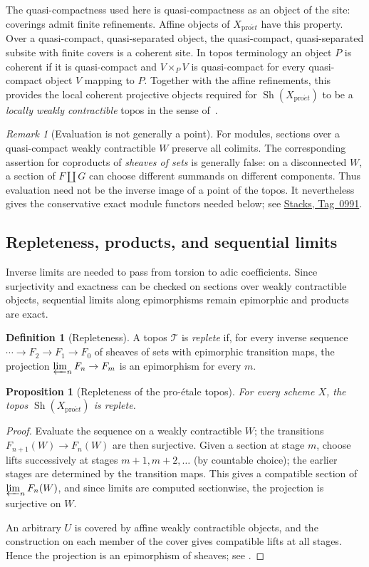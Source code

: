 \documentclass[11pt,a4paper]{article}
\numberwithin{equation}{section}
\newtheorem{proposition}[theorem]{Proposition}
\theoremstyle{definition}
\newtheorem{definition}[theorem]{Definition}
\theoremstyle{remark}
\newtheorem{remark}[theorem]{Remark}
\newcommand{\Sh}{\operatorname{Sh}}
\newcommand{\proet}{\mathrm{pro}\acute{e}t}
\newcommand{\stacks}[1]{\href{https://stacks.math.columbia.edu/tag/#1}{\textnormal{Stacks, Tag~#1}}}
\begin{document}
The quasi-compactness used here is quasi-compactness as an object of the
site: coverings admit finite refinements. Affine objects of
$X_{\proet}$ have this property. Over a quasi-compact, quasi-separated
object, the quasi-compact, quasi-separated subsite with finite covers is
a coherent site. In topos terminology an object $P$ is coherent if it
is quasi-compact and $V\times_PV$ is quasi-compact for every
quasi-compact object $V$ mapping to $P$. Together with the affine
refinements, this provides the local coherent projective objects
required for $\Sh(X_{\proet})$ to be a \emph{locally weakly
contractible} topos in the sense of~\cite{ProetaleBlueprint}.

\begin{remark}[Evaluation is not generally a point]
\label{pe:evaluation-not-point}
For modules, sections over a quasi-compact weakly contractible $W$
preserve all colimits. The corresponding assertion for coproducts of
\emph{sheaves of sets} is generally false: on a disconnected $W$, a
section of $F\amalg G$ can choose different summands on different
components. Thus evaluation need not be the inverse image of a point
of the topos. It nevertheless gives the conservative exact module
functors needed below; see \stacks{0991}.
\end{remark}

\subsection{Repleteness, products, and sequential limits}

Inverse limits are needed to pass from torsion to adic coefficients.
Since surjectivity and exactness can be checked on sections over weakly
contractible objects, sequential limits along epimorphisms remain
epimorphic and products are exact.

\begin{definition}[Repleteness]\label{pe:replete-def}
A topos $\mathcal T$ is \emph{replete} if, for every inverse sequence
$\cdots\to F_2\to F_1\to F_0$ of sheaves of sets with epimorphic
transition maps, the projection $\varprojlim_nF_n\to F_m$ is an
epimorphism for every $m$.
\end{definition}

\begin{proposition}[Repleteness of the pro-\'etale topos]
\label{pe:replete}
For every scheme $X$, the topos $\Sh(X_{\proet})$ is replete.
\end{proposition}
\begin{proof}
Evaluate the sequence on a weakly contractible $W$; the transitions
$F_{n+1}(W)\to F_n(W)$ are then surjective. Given a section at stage
$m$, choose lifts successively at stages $m+1,m+2,\ldots$ (by countable
choice); the earlier stages are determined by the transition maps. This
gives a compatible section of $\varprojlim_nF_n(W)$, and since limits
are computed sectionwise, the projection is surjective on $W$.

An arbitrary $U$ is covered by affine weakly contractible objects, and
the construction on each member of the cover gives compatible lifts at
all stages. Hence the projection is an epimorphism of sheaves; see
\cite[\S\S3.1--3.2]{BS}.
\end{proof}
\end{document}

